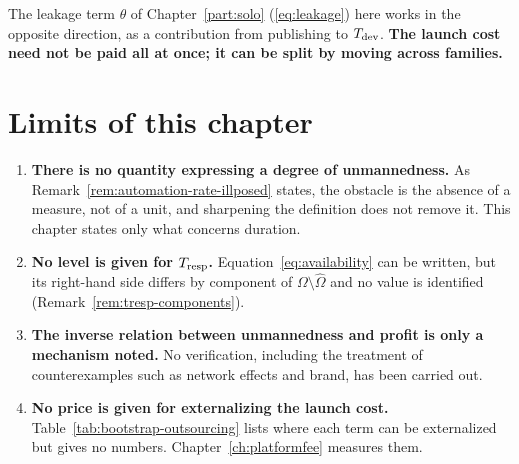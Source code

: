 The leakage term $\theta$ of Chapter~\ref{part:solo} (\eqref{eq:leakage}) here works in the
opposite direction, as a contribution from publishing to $T_{\rm dev}$.
\textbf{The launch cost need not be paid all at once; it can be split by moving across
families.}

\section{Limits of this chapter}
\label{sec:unmanned-limits}

\begin{enumerate}[label=(\arabic*)]
\item \textbf{There is no quantity expressing a degree of unmannedness.}
As Remark~\ref{rem:automation-rate-illposed} states, the obstacle is the absence of a measure,
not of a unit, and sharpening the definition does not remove it. This chapter states only
what concerns duration.

\item \textbf{No level is given for $T_{\rm resp}$.}
Equation~\eqref{eq:availability} can be written, but its right-hand side differs by component
of $\Omega\setminus\hat\Omega$ and no value is identified
(Remark~\ref{rem:tresp-components}).

\item \textbf{The inverse relation between unmannedness and profit is only a mechanism noted.}
No verification, including the treatment of counterexamples such as network effects and
brand, has been carried out.

\item \textbf{No price is given for externalizing the launch cost.}
Table~\ref{tab:bootstrap-outsourcing} lists where each term can be externalized but gives no
numbers. Chapter~\ref{ch:platformfee} measures them.
\end{enumerate}

